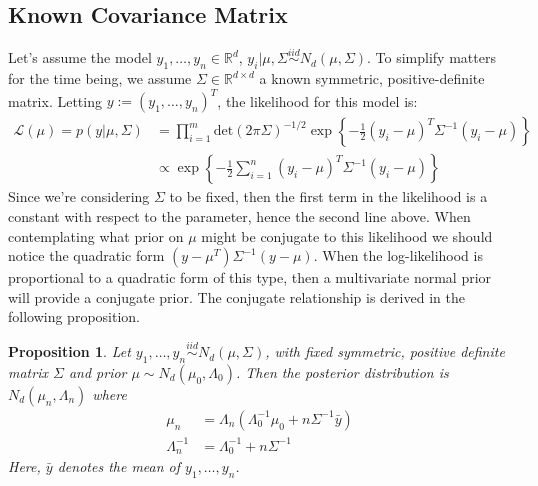 \documentclass[12pt]{article}
\newcommand{\R}{\mathcal{R}}
\def\R{\mathbb{R}}
\newtheorem{prop}{Proposition}
\begin{document}
\subsection{Known Covariance Matrix} \label{mvn_mean}
Let's assume the model $y_1, \dots, y_n \in \R^d$, $y_i|\mu, \Sigma \overset{iid}{\sim} N_d(\mu, \Sigma)$. To simplify matters for the time being, we assume 
$\Sigma \in \R^{d \times d}$ a known symmetric, positive-definite matrix. Letting $y := (y_1, \dots, y_n)^T$, the likelihood for this model is: 
\begin{align*}
\mathcal{L}(\mu) = p(y|\mu, \Sigma) &= \prod_{i = 1}^{m} \text{det}(2\pi \Sigma)^{-1/2} \exp\left\{-\frac{1}{2}(y_i - \mu)^T \Sigma^{-1}(y_i - \mu)\right\} \\
			  			       &\propto \exp\left\{-\frac{1}{2} \sum_{i = 1}^{n} (y_i - \mu)^T \Sigma^{-1}(y_i - \mu)\right\}
\end{align*}
Since we're considering $\Sigma$ to be fixed, then the first term in the likelihood is a constant with respect to the parameter, hence the second line above. 
When contemplating what prior on $\mu$ might be conjugate to this likelihood we should notice the quadratic form $(y - \mu^T)\Sigma^{-1}(y - \mu)$. When the 
log-likelihood is proportional to a quadratic form of this type, then a multivariate normal prior will provide a conjugate prior. The conjugate relationship 
is derived in the following proposition. 
\begin{prop} \label{normal_mean_known_variance}
Let $y_1, \dots, y_n \overset{iid}{\sim} N_d(\mu, \Sigma)$, with fixed symmetric, positive definite matrix $\Sigma$ and prior $\mu \sim N_d(\mu_0, \Lambda_0)$.
Then the posterior distribution is $N_d(\mu_n, \Lambda_n)$
where 
\begin{align*}
\mu_n &= \Lambda_n (\Lambda_0^{-1} \mu_0 + n \Sigma^{-1} \bar{y}) \\
\Lambda_n^{-1} &= \Lambda_0^{-1} + n \Sigma^{-1}
\end{align*}
Here, $\bar{y}$ denotes the mean of $y_1, \dots, y_n$. 
\end{prop}
\end{document}
